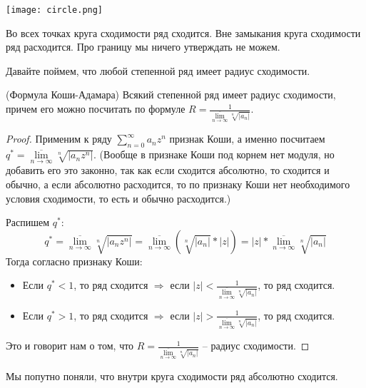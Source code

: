 \begin{center}
    \texttt{[image: circle.png]}    
\end{center}

\begin{notice}
    Во всех точках круга сходимости ряд сходится. 
    Вне замыкания круга сходимости ряд расходится.
    Про границу мы ничего утверждать не можем. 
\end{notice}

\vspace*{10mm}

Давайте поймем, что любой степенной ряд имеет радиус сходимости.

\begin{theorem} (Формула Коши-Адамара)
    Всякий степенной ряд имеет радиус сходимости, причем его можно посчитать по формуле $R = \frac{1}{\overline{\lim\limits_{n \to \infty}} \sqrt[n]{|a_n|}}$.
\end{theorem}
\begin{proof}
    Применим к ряду $\sum\limits_{n = 0}^\infty a_n z^n$ признак Коши, а именно посчитаем $q^* = \overline{\lim\limits_{n \to \infty}} \sqrt[n]{|a_nz^n|}$. 
    (Вообще в признаке Коши под корнем нет модуля, но добавить его это законно, так как если сходится абсолютно, то сходится и обычно, а если абсолютно расходится, то по признаку Коши нет необходимого условия сходимости, то есть и обычно расходится.)

    Распишем $q^*:$ \[ q^* = \overline{\lim_{n \to \infty}} \sqrt[n]{|a_nz^n|} = \overline{\lim_{n \to \infty}} (\sqrt[n]{|a_n|} * |z|) = |z| * \overline{\lim_{n \to \infty}} \sqrt[n]{|a_n|}   \]
    Тогда согласно признаку Коши: \begin{itemize}
        \item Если $q^* < 1$, то ряд сходится $\Rightarrow$ если $|z| < \frac{1}{\overline{\lim\limits_{n \to \infty}} \sqrt[n]{|a_n|}}$, то ряд сходится.
        \item Если $q^* > 1$, то ряд сходится $\Rightarrow$ если $|z| > \frac{1}{\overline{\lim\limits_{n \to \infty}} \sqrt[n]{|a_n|}}$, то ряд сходится.
    \end{itemize}
    Это и говорит нам о том, что $R = \frac{1}{\overline{\lim\limits_{n \to \infty}} \sqrt[n]{|a_n|}}$ -- радиус сходимости.
\end{proof}

\begin{notice}
    Мы попутно поняли, что внутри круга сходимости ряд абсолютно сходится.
\end{notice}

